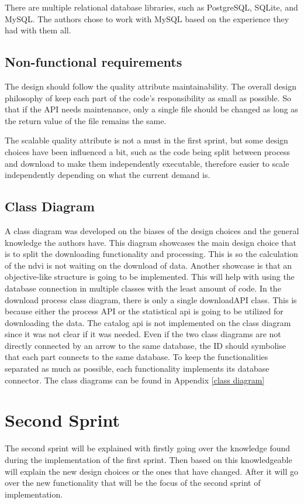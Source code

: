 There are multiple relational database libraries, such as PostgreSQL, SQLite, and MySQL. The authors chose to work with MySQL based on the experience they had with them all. 

\subsection{Non-functional requirements}
The design should follow the quality attribute maintainability. The overall design philosophy of keep each part of the code's responsibility as small as possible. So that if the API needs maintenance, only a single file should be changed as long as the return value of the file remains the same. 

The scalable quality attribute is not a must in the first sprint, but some design choices have been influenced a bit, such as the code being split between process and download to make them independently executable, therefore easier to scale independently depending on what the current demand is.


\subsection{Class Diagram}
A class diagram was developed on the biases of the design choices and the general knowledge the authors have.
This diagram showcases the main design choice that is to split the downloading functionality and processing. This is so the calculation of the ndvi is not waiting on the download of data. 
Another showcase is that an objective-like structure is going to be implemented. This will help with using the database connection in multiple classes with the least amount of code.
In the download process class diagram, there is only a single downloadAPI class. This is because either the process API or the statistical api is going to be utilized for downloading the data. The catalog api is not implemented on the class diagram since it was not clear if it was needed.
Even if the two class diagrams are not directly connected by an arrow to the same database, the ID should symbolise that each part connects to the same database. To keep the functionalities separated as much as possible, each functionality implements its database connector.
The class diagrams can be found in Appendix \ref{class diagram}


\section{Second Sprint}\label{Sec:SecoundPhase}
The second sprint will be explained with firstly going over the knowledge found during the implementation of the first sprint.
Then based on this knowledgeable will explain the new design choices or the ones that have changed. After it will go over the new functionality that will be the focus of the second sprint of implementation. 


